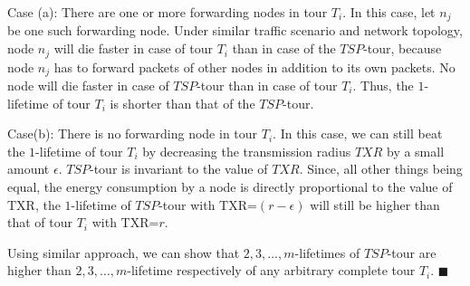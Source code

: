 \documentclass{llncs}
\begin{document}
Case (a): There are one or more forwarding nodes in tour $T_i$. In this case, let $n_j$ be
one such forwarding node. Under similar traffic scenario and  network topology, node $n_j$ will
die faster in case of tour $T_i$ than  in case of the $TSP$-tour, because
 node $n_j$ has to forward packets of other nodes in addition to its own packets. No node will die
 faster in case of $TSP$-tour than in case of tour $T_i$. Thus, the $1$-lifetime of 
 tour $T_i$ is shorter than that of the $TSP$-tour.
 
Case(b): There is no forwarding node in tour $T_i$. In this case, we can still beat the
$1$-lifetime of tour $T_i$ by decreasing the transmission radius $TXR$ by a small amount
$\epsilon$. $TSP$-tour is invariant to the value of $TXR$.
Since, all other things being equal, the energy consumption by a node is directly proportional to
the value of TXR, the $1$-lifetime of $TSP$-tour with
TXR=$(r-\epsilon)$ will still be higher than that of tour $T_i$ with TXR=$r$. 

Using similar approach, we can show that $2,3,\ldots,m$-lifetimes of $TSP$-tour are higher than
$2,3,\ldots,m$-lifetime respectively of any arbitrary complete tour $T_i$. $\blacksquare$
 
\end{document}
